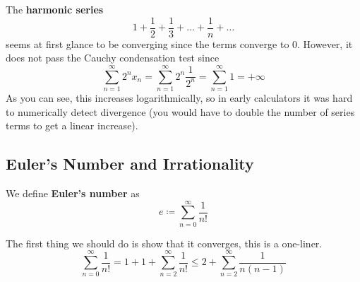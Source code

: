  \begin{example}
    The \textbf{harmonic series} 
    \begin{equation}
      1 + \frac{1}{2} + \frac{1}{3} + \ldots + \frac{1}{n} + \ldots
    \end{equation}
    seems at first glance to be converging since the terms converge to $0$. However, it does not pass the Cauchy condensation test since 
    \begin{equation}
      \sum_{n=1}^\infty 2^n x_n = \sum_{n=1}^\infty 2^n \frac{1}{2^n} = \sum_{n=1}^\infty 1 = +\infty
    \end{equation}
    As you can see, this increases logarithmically, so in early calculators it was hard to numerically detect divergence (you would have to double the number of series terms to get a linear increase). 
  \end{example} 

\subsection{Euler's Number and Irrationality} 

  \begin{definition}
    We define \textbf{Euler's number} as 
    \begin{equation}
      e \coloneqq \sum_{n=0}^\infty \frac{1}{n!}
    \end{equation}
  \end{definition}
  
  The first thing we should do is show that it converges, this is a one-liner. 
  \begin{equation}
    \sum_{n=0}^\infty \frac{1}{n!} = 1 + 1 + \sum_{n=2}^\infty \frac{1}{n!} \leq 2 + \sum_{n=2}^\infty \frac{1}{n(n-1)} 
  \end{equation}

